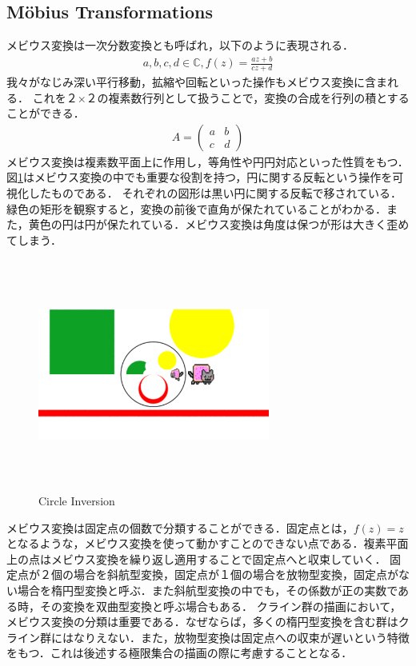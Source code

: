 \subsection{M\"obius Transformations}
メビウス変換は一次分数変換とも呼ばれ，以下のように表現される．
\begin{eqnarray*}
 a, b, c, d\in \mathbb{C}, f(z) = \frac{az + b}{cz + d}
\end{eqnarray*}
我々がなじみ深い平行移動，拡縮や回転といった操作もメビウス変換に含まれる．
これを２×２の複素数行列として扱うことで，変換の合成を行列の積とすることができる．
\begin{eqnarray*}
  A = \left(
    \begin{array}{ccc}
      a & b \\
      c & d
    \end{array}
  \right)
\end{eqnarray*}
メビウス変換は複素数平面上に作用し，等角性や円円対応といった性質をもつ．
図\ref{fig:circleInversion}はメビウス変換の中でも重要な役割を持つ，円に関する反転という操作を可視化したものである．
それぞれの図形は黒い円に関する反転で移されている．緑色の矩形を観察すると，変換の前後で直角が保たれていることがわかる．また，黄色の円は円が保たれている．メビウス変換は角度は保つが形は大きく歪めてしまう．
\begin{figure}[htbp]
 \begin{center}
      \includegraphics[width=3in, height=3in, keepaspectratio]{../img/klein/circleInversion.pdf}
    \caption{Circle Inversion}
    \label{fig:circleInversion}
 \end{center}
\end{figure}

メビウス変換は固定点の個数で分類することができる．固定点とは，$f(z) = z$となるような，メビウス変換を使って動かすことのできない点である．複素平面上の点はメビウス変換を繰り返し適用することで固定点へと収束していく．
固定点が２個の場合を斜航型変換，固定点が１個の場合を放物型変換，固定点がない場合を楕円型変換と呼ぶ．また斜航型変換の中でも，その係数が正の実数である時，その変換を双曲型変換と呼ぶ場合もある．
クライン群の描画において，メビウス変換の分類は重要である．なぜならば，多くの楕円型変換を含む群はクライン群にはなりえない．また，放物型変換は固定点への収束が遅いという特徴をもつ．これは後述する極限集合の描画の際に考慮することとなる．

